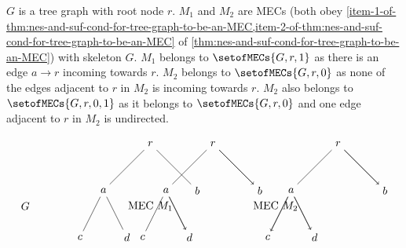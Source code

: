 \documentclass{article}
\begin{document}
$G$ is a tree graph with root node $r$. $M_1$ and $M_2$ are MECs (both obey \cref{item-1-of-thm:nes-and-suf-cond-for-tree-graph-to-be-an-MEC,item-2-of-thm:nes-and-suf-cond-for-tree-graph-to-be-an-MEC} of \cref{thm:nes-and-suf-cond-for-tree-graph-to-be-an-MEC}) with skeleton $G$. $M_1$ belongs to $\setofMECs{G, r, 1}$ as there is an edge $a\rightarrow r$ incoming towards $r$. $M_2$ belongs to $\setofMECs{G, r, 0}$ as none of the edges adjacent to $r$ in $M_2$ is incoming towards $r$. $M_2$ also belongs to $\setofMECs{G, r, 0, 1}$ as it belongs to $\setofMECs{G, r, 0}$ and one edge adjacent to $r$ in $M_2$ is undirected.

\[
\begin{tikzpicture}[level distance=1.5cm,
  level 1/.style={sibling distance=3cm},
  level 2/.style={sibling distance=1.5cm}]
  \node at (0,0) {$r$}
    child {node {$a$}
      child {node {$c$}}
      child {node {$d$}}
    }
    child {node {$b$}};
  \node at (-4,-2) {$G$};
  
  \node at (2,0) {$r$}
    child {node {$a$}
      child {node {$c$}}
      child {node {$d$} edge from parent[draw=none] edge from parent[->]}
    }
    child {node {$b$} edge from parent[draw=none] edge from parent[->]};
  \node at (0,-2) {MEC $M_1$};
  
  \node at (6,0) {$r$}
    child {node {$a$}
      child {node {$c$} edge from parent[draw=none] edge from parent[->]}
      child {node {$d$} edge from parent[draw=none] edge from parent[->]}
    }
    child {node {$b$} edge from parent[draw=none] edge from parent[->]};
  \node at (4,-2) {MEC $M_2$};
\end{tikzpicture}
\]
\end{document}
